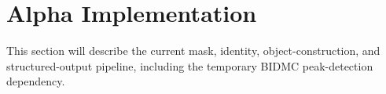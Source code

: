 \section{Alpha Implementation}

This section will describe the current mask, identity, object-construction, and structured-output pipeline, including the temporary BIDMC peak-detection dependency.
